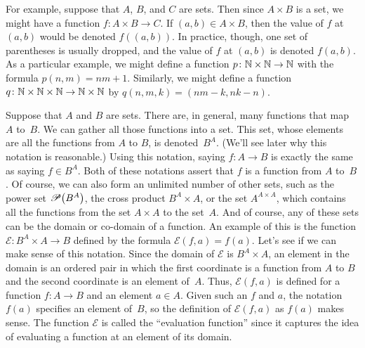 For example, suppose that $A$, $B$, and $C$ are sets.
Then since $A\times B$ is a set, we might have a function $f\colon A\times B\to C$.
If $(a,b)\in A\times B$, then the value of $f$ at $(a,b)$ would be denoted $f((a,b))$.
In practice, though, one set of parentheses is usually dropped, and the value of $f$ at $(a,b)$ is denoted $f(a,b)$.
As a particular example, we might define a function $p\colon {\mathbb N}\times{\mathbb N}\to{\mathbb N}$ with the formula $p(n,m)=nm+1$.
Similarly, we might define a function $q\colon {\mathbb N}\times{\mathbb N}\times{\mathbb N}\to{\mathbb N}\times{\mathbb N}$ by $q(n,m,k)=(nm-k,nk-n)$.

Suppose that $A$ and $B$ are sets.
There are, in general, many functions that map $A$ to~$B$.
We can gather all those functions into a set.
This set, whose elements are all the functions from $A$ to $B$, is denoted~$B^A$.
(We'll see later why this notation is reasonable.)  
Using this notation, saying $f\colon A\to B$ is exactly the same as saying $f\in B^A$.
Both of these notations assert that $f$ is a function from $A$ to~$B$.
Of course, we can also form an unlimited number of other sets, such as the power set ${\mathscr P}\big(B^A\big)$, the cross product $B^A\times A$, or the set $A^{A\times A}$, which contains all the functions from the set $A\times A$ to the set~$A$.
And of course, any of these sets can be the domain or co-domain of a function.
An example of this is the function ${\mathscr E}\colon B^A\times A\to B$ defined by the formula ${\mathscr E}(f,a) = f(a)$.
Let's see if we can make sense of this notation.
Since the domain of ${\mathscr E}$ is $B^A\times A$, an element in the domain is an ordered pair in which the first coordinate is a function from $A$ to $B$ and the second coordinate is an element of~$A$.
Thus, ${\mathscr E}(f,a)$ is defined for a function $f\colon A\to B$ and an element $a\in A$.
Given such an $f$ and $a$, the notation $f(a)$ specifies an element of~$B$, so the definition of ${\mathscr E}(f,a)$ as $f(a)$ makes sense.
The function ${\mathscr E}$ is called the ``evaluation function'' since it captures the idea of evaluating a function at an element of its domain.



